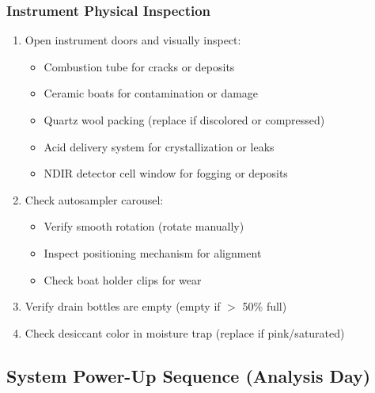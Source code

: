 \documentclass[11pt,a4paper]{article}\usepackage[]{graphicx}\usepackage[]{xcolor}
\begin{document}
\subsubsection{Instrument Physical Inspection}
\begin{enumerate}[noitemsep]
    \item Open instrument doors and visually inspect:
    \begin{itemize}
        \item Combustion tube for cracks or deposits
        \item Ceramic boats for contamination or damage
        \item Quartz wool packing (replace if discolored or compressed)
        \item Acid delivery system for crystallization or leaks
        \item NDIR detector cell window for fogging or deposits
    \end{itemize}
    \item Check autosampler carousel:
    \begin{itemize}
        \item Verify smooth rotation (rotate manually)
        \item Inspect positioning mechanism for alignment
        \item Check boat holder clips for wear
    \end{itemize}
    \item Verify drain bottles are empty (empty if $>$ 50\% full)
    \item Check desiccant color in moisture trap (replace if pink/saturated)
\end{enumerate}

\subsection{System Power-Up Sequence (Analysis Day)}
\end{document}
